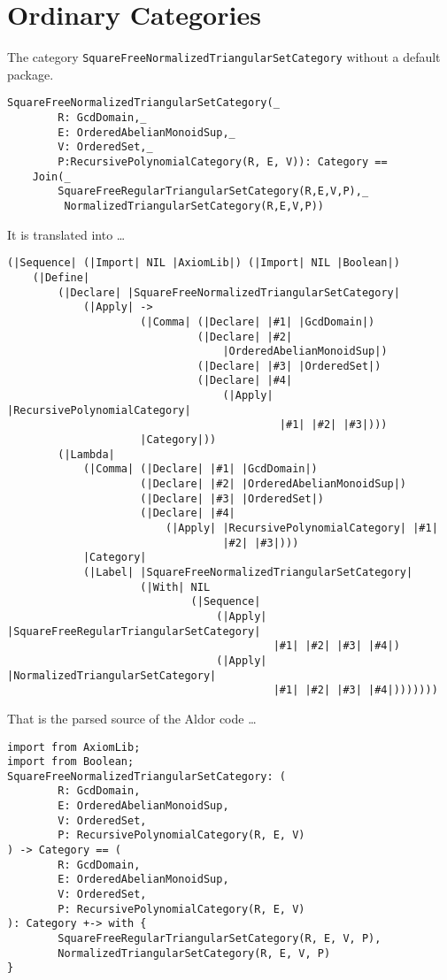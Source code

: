 \documentclass{article}
\begin{document}
\section{Ordinary Categories}\label{sec:Category}
The category \verb'SquareFreeNormalizedTriangularSetCategory' without
a default package.
\begin{verbatim}
SquareFreeNormalizedTriangularSetCategory(_
        R: GcdDomain,_
        E: OrderedAbelianMonoidSup,_
        V: OrderedSet,_
        P:RecursivePolynomialCategory(R, E, V)): Category ==
    Join(_
        SquareFreeRegularTriangularSetCategory(R,E,V,P),_
         NormalizedTriangularSetCategory(R,E,V,P))
\end{verbatim}
It is translated into \ldots
\begin{verbatim}
(|Sequence| (|Import| NIL |AxiomLib|) (|Import| NIL |Boolean|)
    (|Define|
        (|Declare| |SquareFreeNormalizedTriangularSetCategory|
            (|Apply| ->
                     (|Comma| (|Declare| |#1| |GcdDomain|)
                              (|Declare| |#2|
                                  |OrderedAbelianMonoidSup|)
                              (|Declare| |#3| |OrderedSet|)
                              (|Declare| |#4|
                                  (|Apply| |RecursivePolynomialCategory|
                                           |#1| |#2| |#3|)))
                     |Category|))
        (|Lambda|
            (|Comma| (|Declare| |#1| |GcdDomain|)
                     (|Declare| |#2| |OrderedAbelianMonoidSup|)
                     (|Declare| |#3| |OrderedSet|)
                     (|Declare| |#4|
                         (|Apply| |RecursivePolynomialCategory| |#1|
                                  |#2| |#3|)))
            |Category|
            (|Label| |SquareFreeNormalizedTriangularSetCategory|
                     (|With| NIL
                             (|Sequence|
                                 (|Apply| |SquareFreeRegularTriangularSetCategory|
                                          |#1| |#2| |#3| |#4|)
                                 (|Apply| |NormalizedTriangularSetCategory|
                                          |#1| |#2| |#3| |#4|)))))))
\end{verbatim}
That is the parsed source of the Aldor code \ldots
\begin{verbatim}
import from AxiomLib;
import from Boolean;
SquareFreeNormalizedTriangularSetCategory: (
        R: GcdDomain,
        E: OrderedAbelianMonoidSup,
        V: OrderedSet,
        P: RecursivePolynomialCategory(R, E, V)
) -> Category == (
        R: GcdDomain,
        E: OrderedAbelianMonoidSup,
        V: OrderedSet,
        P: RecursivePolynomialCategory(R, E, V)
): Category +-> with {
        SquareFreeRegularTriangularSetCategory(R, E, V, P),
        NormalizedTriangularSetCategory(R, E, V, P)
}
\end{verbatim}
\end{document}
